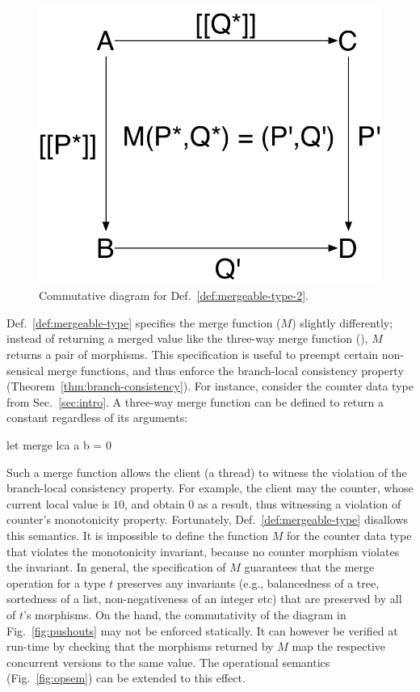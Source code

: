 \begin{figure}
\centering
\includegraphics[scale=0.4]{Figures/pushouts-2}

\caption{Commutative diagram for Def.~\ref{def:mergeable-type-2}.}
\label{fig:pushouts-2}
\end{figure}

Def.~\ref{def:mergeable-type} specifies the merge function ($M$)
slightly differently; instead of returning a merged value like the
three-way merge function (), $M$ returns a pair of morphisms.
This specification is useful to preempt certain non-sensical merge
functions, and thus enforce the branch-local consistency property
(Theorem~\ref{thm:branch-consistency}). For instance, consider the
counter data type from Sec.~\ref{sec:intro}. A three-way merge
function can be defined to return a constant regardless of its
arguments:
\begin{ocaml}
  let merge lca a b = 0
\end{ocaml} Such a merge function allows the client (a thread) to
witness the violation of the branch-local consistency property. For
example, the client may  the counter, whose current local
value is $10$, and obtain $0$ as a result, thus witnessing a violation
of counter's monotonicity property. Fortunately,
Def.~\ref{def:mergeable-type} disallows this semantics. It is
impossible to define the function $M$ for the counter data type that
violates the monotonicity invariant, because no counter morphism
violates the invariant. In general, the specification of $M$
guarantees that the merge operation for a type $t$ preserves any
invariants (e.g., balancedness of a tree, sortedness of a list,
non-negativeness of an integer etc) that are preserved by all of $t$'s
morphisms. On the hand, the commutativity of the diagram in
Fig.~\ref{fig:pushouts} may not be enforced statically. It can however
be verified at run-time by checking that the morphisms returned by $M$
map the respective concurrent versions to the same value. The
operational semantics (Fig.~\ref{fig:opsem}) can be extended to this
effect.

